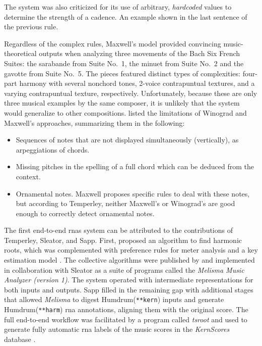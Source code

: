 The system was also criticized for its use of arbitrary,
\emph{hardcoded} values to determine the strength of a
cadence. An example shown in the last sentence of the
previous rule.

Regardless of the complex rules, Maxwell's model provided
convincing music-theoretical outputs when analyzing three
movements of the Bach Six French Suites: the sarabande from
Suite No.~1, the minuet from Suite No.~2 and the gavotte
from Suite No.~5. The pieces featured distinct types of
complexities: four-part harmony with several nonchord tones,
2-voice contrapuntual textures, and a varying contrapuntual
texture, respectively. Unfortunately, because these are only
three musical examples by the same composer, it is unlikely
that the system would generalize to other compositions.
\textcite{temperley1997algorithm} listed the limitations of
Winograd and Maxwell's approaches, summarizing them in the
following:

\begin{itemize}
    \item Sequences of notes that are not displayed
    simultaneously (vertically), as arpeggiations of chords.
    \item Missing pitches in the spelling of a full chord
    which can be deduced from the context.
    \item Ornamental notes. Maxwell proposes specific rules
    to deal with these notes, but according to Temperley,
    neither Maxwell's or Winograd's are good enough to
    correctly detect ornamental notes.
\end{itemize}


The first end-to-end \glspl{rna} system can be attributed to
the contributions of Temperley, Sleator, and Sapp. First,
\textcite{temperley1997algorithm} proposed an algorithm to
find harmonic roots, which was complemented with preference
rules for meter analysis \parencite{temperley1999modeling}
and a key estimation model \parencite{temperley1999whats}.
The collective algorithms were published by
\textcite{temperley2004cognition} and implemented in
collaboration with Sleator as a suite of programs called the
\emph{Melisma Music Analyzer (version
1)}.
The system operated with intermediate representations for
both inputs and outputs. Sapp filled in the remaining gap
with additional stages that allowed \emph{Melisma} to digest
Humdrum(\texttt{**kern}) inputs and generate
Humdrum(\texttt{**harm}) \gls{rna} annotations, aligning
them with the original score. The full end-to-end workflow
was facilitated by a program called \emph{tsroot}
\parencite{sapp2009tsroot} and used to generate fully
automatic \gls{rna} labels of the music scores in the
\emph{KernScores} database \parencite{sapp2005online}.

